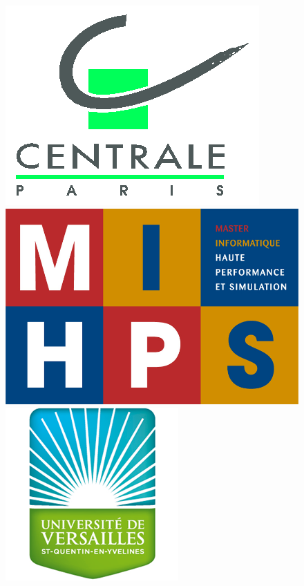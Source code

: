 \documentclass[11pt]{article}
\begin{document}
\begin{figure}[h!]
\begin{minipage}[b]{0.33\linewidth}
\centering \includegraphics[scale=0.4]{logo_ECP.png}
\end{minipage}\hfill
\begin{minipage}[b]{0.33\linewidth}
\centering \includegraphics[scale=0.5]{logo_mihp.jpg}
\end{minipage}\hfill
\begin{minipage}[b]{0.33\linewidth}
\centering \includegraphics[scale=0.4]{logo_uvsq.png}
\end{minipage}\hfill
\end{figure}
\newpage
\pagestyle{fancy}
\lhead{\thepart}
\cfoot{\thepage}
{}
\renewcommand{\contentsname}{Sommaire}
\tableofcontents
\end{document}
